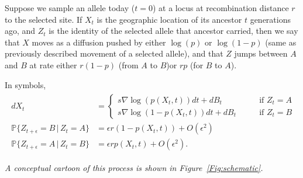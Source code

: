 \documentclass[11pt,letterpaper]{article}
\newcommand{\alisa}[1]{{\em \color{red} #1}}
\renewcommand{\P}{\mathbb{P}}
\newcommand{\grad}{\nabla}
\newcommand{\given}{\,\vert\,}
\begin{document}
Suppose we sample an allele today ($t=0$) at a locus at recombination distance $r$ to the selected site.
If $X_t$ is the geographic location of its ancestor $t$ generations ago,
and $Z_t$ is the identity of the selected allele that ancestor carried,
then we say that $X$ moves as a diffusion pushed by either $\log(p)$ or $\log(1-p)$ (same as previously described movement of a selected allele),
and that $Z$ jumps between $A$ and $B$ at rate either $r (1-p)$  (from $A$ to $B$)or $r p$ (for $B$ to $A$).

In symbols,
\begin{align}
    \begin{aligned} \label{eqn:lineage_motion}
        dX_t &= \begin{cases}
             s \grad \log(p(X_t,t)) dt + dB_t \qquad & \text{if } Z_t = A \\
             s \grad \log(1-p(X_t,t)) dt + dB_t \qquad & \text{if } Z_t = B 
        \end{cases} \\
        \P\{ Z_{t+\epsilon} = B \given Z_t = A \} &= \epsilon r (1-p(X_t,t)) + O(\epsilon^2) \\
        \P\{ Z_{t+\epsilon} = A \given Z_t = B \} &= \epsilon r p(X_t,t) + O(\epsilon^2)  .
    \end{aligned}
\end{align}

\alisa{A conceptual cartoon of this process is shown in Figure~\ref{Fig:schematic}.}
\end{document}

